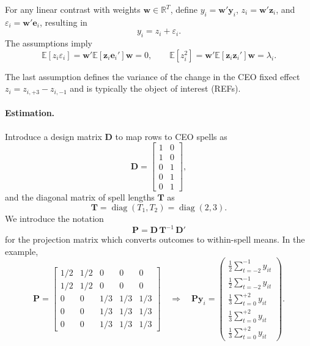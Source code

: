 \documentclass[11pt,a4paper]{article}
\begin{document}
For any linear contrast with weights $\mathbf w\in\mathbb R^T$, define $y_i=\mathbf w'\mathbf y_i$, $z_i=\mathbf w'\mathbf z_i$, and $\varepsilon_i=\mathbf w'\mathbf e_i$, resulting in
\begin{equation}
y_i = z_i + \varepsilon_i.
\end{equation}
The assumptions imply
\begin{equation}
\mathbb E[z_i\varepsilon_i] = \mathbf w'\mathbb E[\mathbf z_i\mathbf e_i']\mathbf w = 0,
\qquad \mathbb E[z_i^2] = \mathbf w'\mathbb E[\mathbf z_i\mathbf z_i']\mathbf w = \lambda_i.
\end{equation}


The last assumption defines the variance of the change in the CEO fixed effect $z_i = z_{i,+3} - z_{i,-1}$ and is typically the object of interest (REFs).

\paragraph{Estimation.} Introduce a design matrix $\mathbf D$ to map rows to CEO spells as
\[
  \mathbf D = \begin{bmatrix}
    1 & 0\\
    1 & 0\\
    0 & 1\\
    0 & 1\\
    0 & 1
  \end{bmatrix},
\]
and the diagonal matrix of spell lengths $\mathbf T$ as
$$
  \mathbf T = \operatorname{diag}(T_1,T_2)=\operatorname{diag}(2,3).
$$
We introduce the notation
$$
  \mathbf P = \mathbf D\,\mathbf T^{-1}\,\mathbf D'
$$
for the projection matrix which converts outcomes to within-spell means. In the example,
\[
  \mathbf P = \begin{bmatrix}
    1/2 & 1/2 & 0 & 0 & 0\\
    1/2 & 1/2 & 0 & 0 & 0\\
    0 & 0 & 1/3 & 1/3 & 1/3\\
    0 & 0 & 1/3 & 1/3 & 1/3\\
    0 & 0 & 1/3 & 1/3 & 1/3
  \end{bmatrix}\quad\Rightarrow\quad
  \mathbf {Py}_i = 
  \begin{pmatrix}
  \frac12 \sum_{t=-2}^{-1} y_{it} \\
  \frac12 \sum_{t=-2}^{-1} y_{it} \\
  \frac13 \sum_{t=0}^{+2} y_{it}\\
  \frac13 \sum_{t=0}^{+2} y_{it}\\
  \frac13 \sum_{t=0}^{+2} y_{it}
  \end{pmatrix}.
\]
\end{document}

